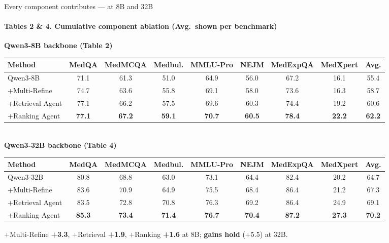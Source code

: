 \documentclass[10pt, aspectratio=169, t]{beamer}   %
\newcommand{\good}[1]{{\color{posblue}\bfseries #1}}  %
\newcommand{\blue}{\color{posblue}\bfseries}  %
\newcommand{\figcap}[1]{{\color{muted}\scriptsize #1}}
\begin{document}
\begin{frame}{Every component contributes — at 8B and 32B}
  \framesubtitle{Tables 2 \& 4. Cumulative component ablation (Avg.\ shown per benchmark)}
  \scriptsize
  \renewcommand{\arraystretch}{1.05}
  \setlength{\tabcolsep}{3.2pt}
  \begin{center}
  \textbf{\color{accent} Qwen3-8B backbone \;(Table 2)}\\[2pt]
  \begin{tabular}{l ccccccc c}
    \toprule
    \textbf{Method} & MedQA & MedMCQA & Medbul. & MMLU-Pro & NEJM & MedExpQA & MedXpert & \textbf{Avg.}\\
    \midrule
    Qwen3-8B          & 71.1 & 61.3 & 51.0 & 64.9 & 56.0 & 67.2 & 16.1 & 55.4\\
    +Multi-Refine     & 74.7 & 63.6 & 55.8 & 69.1 & 58.0 & 73.6 & 16.3 & 58.7\\
    +Retrieval Agent  & 77.1 & 66.2 & 57.5 & 69.6 & 60.3 & 74.4 & 19.2 & 60.6\\
    \rowcolor{accent!12}
    +Ranking Agent    & \textbf{77.1} & \textbf{67.2} & \textbf{59.1} & \textbf{70.7} & \textbf{60.5} & \textbf{78.4} & \textbf{22.2} & \textbf{62.2}\\
    \bottomrule
  \end{tabular}
  \\[6pt]
  \textbf{\color{accent} Qwen3-32B backbone \;(Table 4)}\\[2pt]
  \begin{tabular}{l ccccccc c}
    \toprule
    \textbf{Method} & MedQA & MedMCQA & Medbul. & MMLU-Pro & NEJM & MedExpQA & MedXpert & \textbf{Avg.}\\
    \midrule
    Qwen3-32B         & 80.8 & 68.8 & 63.0 & 73.1 & 64.4 & 82.4 & 20.2 & 64.7\\
    +Multi-Refine     & 83.6 & 70.9 & 64.9 & 75.5 & 68.4 & 86.4 & 21.2 & 67.3\\
    +Retrieval Agent  & 83.5 & 72.8 & 70.8 & 76.3 & 69.2 & 86.4 & 24.9 & 69.1\\
    \rowcolor{accent!12}
    +Ranking Agent    & \textbf{85.3} & \textbf{73.4} & \textbf{71.4} & \textbf{76.7} & \textbf{70.4} & \textbf{87.2} & \textbf{27.3} & \textbf{70.2}\\
    \bottomrule
  \end{tabular}
  \end{center}
  \vspace{1pt}
  \figcap{\;\;+Multi-Refine {\blue +3.3}, +Retrieval {\blue +1.9}, +Ranking {\blue +1.6} at 8B; \good{gains hold} (+5.5) at 32B.}
\end{frame}
\end{document}
